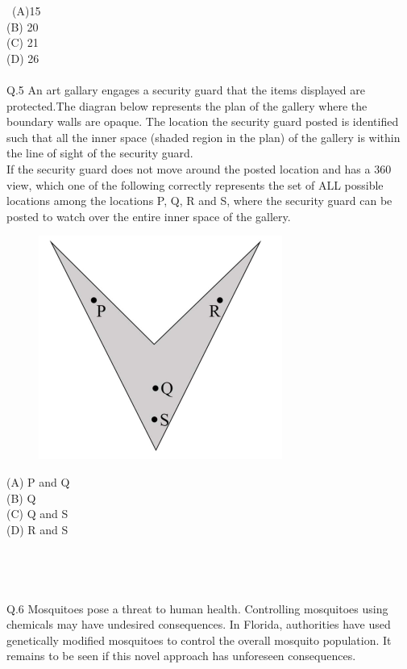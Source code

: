 \documentclass{book}[200pt]
\begin{document}
{\begin{figure}[H]
	 	\caption{}
	 	\label{fig:screenshot001}
	 \end{figure}\	(A)15\\
	(B) 20\\
	(C) 21\\
	(D) 26\\
	 \\
	 Q.5 An art gallary engages a security guard that the items displayed are protected.The diagran below represents the plan of the gallery where the boundary walls are opaque. The location the security guard posted is identified such that all the inner space (shaded region in the plan) of the gallery is within the line of sight of the security guard.\\
	 If the security guard does not move around the posted location and has a 360 view, which one of the following correctly represents the set of ALL possible locations among the locations P, Q, R and S, where the security guard can be posted to watch over the entire inner space of the gallery.\\
\begin{figure}[H]
	\centering
	\includegraphics[width=0.3\linewidth]{screenshot002}
	\caption{}
	\label{fig:screenshot002}
\end{figure}
	 (A) P and Q\\
	 (B) Q\\
	 (C) Q and S\\
	 (D) R and S\\
	 \pagebreak
	 \\
	 \\
	 \\
	 \\
	 Q.6 Mosquitoes pose a threat to human health. Controlling mosquitoes using
	 chemicals may have undesired consequences. In Florida, authorities have used
	 genetically modified mosquitoes to control the overall mosquito population. It
	 remains to be seen if this novel approach has unforeseen consequences.\\
	 
}
\end{document}
